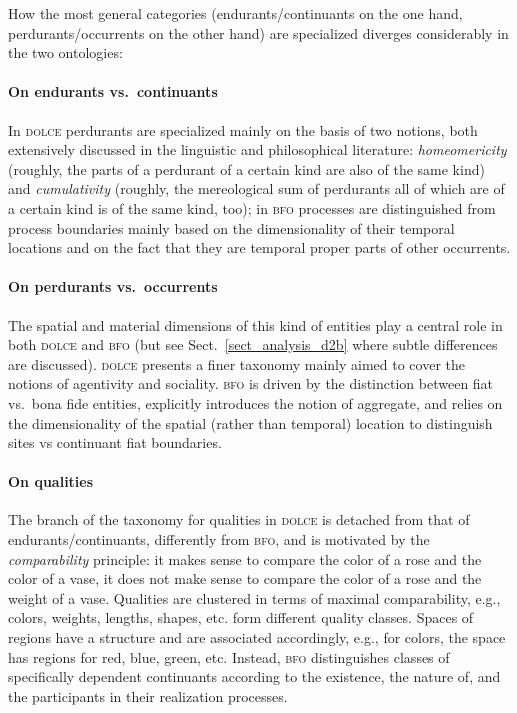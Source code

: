 \documentclass[ao]{iosart2x}
\newcommand{\dolce}{{\textsc{dolce}}}
\newcommand{\bfo}{{\textsc{bfo}}}
\begin{document}
How the most general categories (endurants/continuants on the one hand, perdurants/occurrents on the other hand) are specialized
diverges considerably in the two ontologies:

\paragraph{On endurants vs.~continuants} In {\dolce} perdurants are specialized mainly on the basis of two notions, both extensively discussed in the linguistic and philosophical literature: \emph{homeomericity} (roughly, the parts of a perdurant of a certain kind are also of the same kind) and \emph{cumulativity} (roughly, the mereological sum of perdurants all of which are of a certain kind is of the same kind, too); in {\bfo} processes are distinguished from process boundaries mainly based on the dimensionality of their temporal locations and on the fact that they are temporal proper parts of other occurrents.

\paragraph{On perdurants vs.~occurrents} The spatial and material dimensions of this kind of entities play a central role in both {\dolce} and {\bfo} (but see Sect.~\ref{sect_analysis_d2b} where subtle differences are discussed). {\dolce} presents a finer taxonomy mainly aimed to cover the notions of agentivity and sociality. {\bfo} is driven by the distinction between fiat vs.~bona fide entities, explicitly introduces the notion of aggregate, and relies on the dimensionality of the spatial (rather than temporal) location to distinguish sites vs continuant fiat boundaries.

\paragraph{On qualities} The branch of the taxonomy for qualities in {\dolce} is detached from that of endurants/continuants, differently from {\bfo}, and is motivated by the \emph{comparability} principle: it makes sense to compare the color of a rose and the color of a vase, it does not make sense to compare the color of a rose and the weight of a vase. Qualities are clustered in terms of maximal comparability, e.g., colors, weights, lengths, shapes, etc. form different quality classes. Spaces of regions have a structure and are associated accordingly, e.g., for colors, the space has regions for red, blue, green, etc. Instead, {\bfo} distinguishes classes of specifically dependent continuants according to the existence, the nature of, and the participants in their realization processes.
\end{document}
